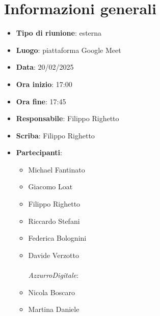 


\section{Informazioni generali}

\begin{itemize}
    \item \textbf{Tipo di riunione}: esterna
    \item \textbf{Luogo}: piattaforma Google Meet
    \item \textbf{Data}: 20/02/2025
    \item \textbf{Ora inizio}: 17:00
    \item \textbf{Ora fine}: 17:45
    \item \textbf{Responsabile}: Filippo Righetto
    \item \textbf{Scriba}: Filippo Righetto
    \item \textbf{Partecipanti}:
    \begin{itemize}
        \item Michael Fantinato
        \item Giacomo Loat
        \item Filippo Righetto
        \item Riccardo Stefani
        \item Federica Bolognini
        \item Davide Verzotto \\ \\
        \emph{AzzurroDigitale}:
        \item Nicola Boscaro
        \item Martina Daniele
    \end{itemize}
\end{itemize}
